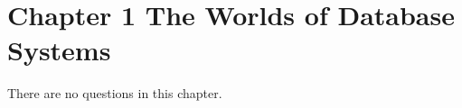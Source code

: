 \documentclass[../../main.tex]{subfiles}
\begin{document}
\section{Chapter 1 The Worlds of Database Systems}

There are no questions in this chapter.
\end{document}
